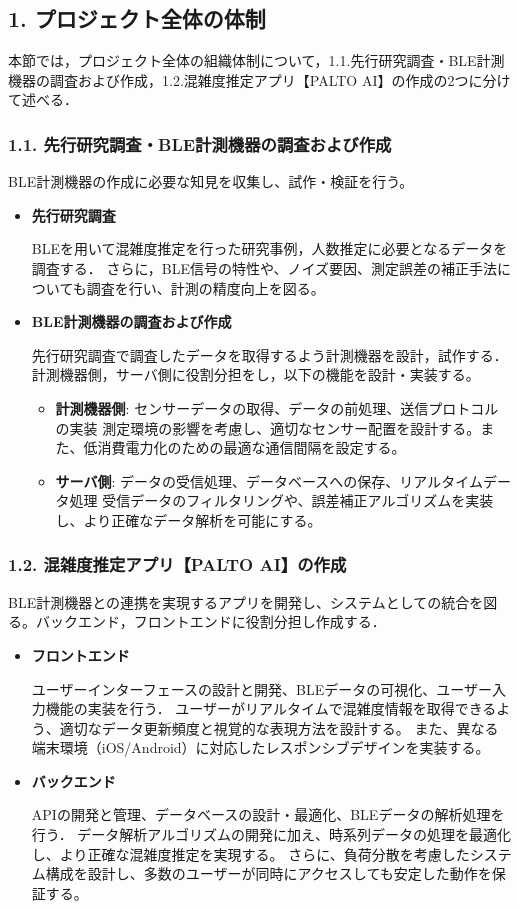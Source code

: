 \subsection*{1. プロジェクト全体の体制}
本節では，プロジェクト全体の組織体制について，1.1.先行研究調査・BLE計測機器の調査および作成，1.2.混雑度推定アプリ【PALTO AI】の作成の2つに分けて述べる．

\subsubsection*{1.1. 先行研究調査・BLE計測機器の調査および作成}
BLE計測機器の作成に必要な知見を収集し、試作・検証を行う。
\begin{itemize}
    \item {\bfseries 先行研究調査}
    
    BLEを用いて混雑度推定を行った研究事例，人数推定に必要となるデータを調査する．
	さらに，BLE信号の特性や、ノイズ要因、測定誤差の補正手法についても調査を行い、計測の精度向上を図る。
    
    \item {\bfseries BLE計測機器の調査および作成}
    
    先行研究調査で調査したデータを取得するよう計測機器を設計，試作する．
    計測機器側，サーバ側に役割分担をし，以下の機能を設計・実装する。
    \begin{itemize}
        \item {\bfseries 計測機器側}: センサーデータの取得、データの前処理、送信プロトコルの実装
		測定環境の影響を考慮し、適切なセンサー配置を設計する。また、低消費電力化のための最適な通信間隔を設定する。
        \item {\bfseries サーバ側}: データの受信処理、データベースへの保存、リアルタイムデータ処理
		受信データのフィルタリングや、誤差補正アルゴリズムを実装し、より正確なデータ解析を可能にする。
    \end{itemize}
\end{itemize}

\subsubsection*{1.2. 混雑度推定アプリ【PALTO AI】の作成}
BLE計測機器との連携を実現するアプリを開発し、システムとしての統合を図る。バックエンド，フロントエンドに役割分担し作成する．
\begin{itemize}
    \item {\bfseries フロントエンド}
    
    ユーザーインターフェースの設計と開発、BLEデータの可視化、ユーザー入力機能の実装を行う．
	ユーザーがリアルタイムで混雑度情報を取得できるよう、適切なデータ更新頻度と視覚的な表現方法を設計する。
	また、異なる端末環境（iOS/Android）に対応したレスポンシブデザインを実装する。
    
    \item {\bfseries バックエンド}
    
    APIの開発と管理、データベースの設計・最適化、BLEデータの解析処理を行う．
	データ解析アルゴリズムの開発に加え、時系列データの処理を最適化し、より正確な混雑度推定を実現する。
	さらに、負荷分散を考慮したシステム構成を設計し、多数のユーザーが同時にアクセスしても安定した動作を保証する。
\end{itemize}


